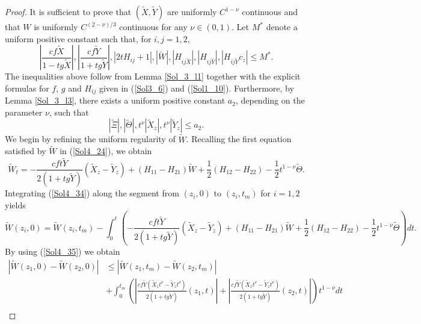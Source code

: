 \documentclass[10pt,a4paper]{amsart}
\begin{document}
 \begin{proof}
     It is sufficient to prove that $(\widetilde X, \widetilde Y)$ are uniformly $C^{1-\nu}$ continuous and that $W$ is uniformly $C^{(2-\nu)/3}$ continuous for any $\nu\in(0,1)$. Let $M^{\ast}$ denote a uniform positive constant such that, for $i,j=1,2$,
     \begin{equation}\label{Sol4_32}
         \left | \frac{cf\widetilde X}{1-tg\widetilde X}\right|, \left | \frac{cf\widetilde Y}{1+tg\widetilde Y}\right|, |2tH_{ij}+1|, |\widetilde W|, |H_{ij\widetilde X}|, |H_{ij\widetilde Y}|,|H_{ij\widetilde Y}c_z|\leq M^*.
     \end{equation}
     The inequalities above follow from Lemma \ref{Sol_3_l1} together with the explicit formulas for $f$, $g$ and $H_{ij}$ given in (\ref{Sol3_6}) and (\ref{Sol1_10}). Furthermore, by Lemma \ref{Sol_3_l3}, there exists a uniform positive constant $a_{2}$, depending on the parameter $\nu$, such that
     \begin{equation}\label{Sol4_33}
         |\widetilde\Xi|, |\widetilde\Theta|, t^\nu|\widetilde X_z|, t^\nu|\widetilde Y_z|\leq a_2.
     \end{equation}
     We begin by refining the uniform regularity of $\widetilde W$. Recalling the first equation satisfied by $\widetilde W$ in (\ref{Sol4_24}), we obtain
     \begin{equation}\label{Sol4_34}
         \widetilde W_t=-\frac{cft\widetilde Y}{2(1+tg\widetilde Y)}(\widetilde X_z-\widetilde Y_z) +(H_{11}-H_{21})\widetilde W+\frac{1}{2}(H_{12}-H_{22})-\frac{1}{2}t^{1-\nu}\widetilde \Theta.
     \end{equation}
     Integrating (\ref{Sol4_34}) along the segment from $(z_{i},0)$ to $(z_{i},t_{m})$ for $i=1,2$ yields
     \begin{equation}\label{Sol4_35}
          \widetilde W(z_i,0)=\widetilde W(z_i,t_m)-\int_0^t\left(-\frac{cft\widetilde Y}{2(1+tg\widetilde Y)}(\widetilde X_z-\widetilde Y_z) +(H_{11}-H_{21})\widetilde W+\frac{1}{2}(H_{12}-H_{22})-\frac{1}{2}t^{1-\nu}\widetilde \Theta \right)dt.
     \end{equation}
     By using (\ref{Sol4_35}) we obtain
     \begin{equation}\label{Sol4_36}
          \begin{split}
              |\widetilde W(z_1,0)-\widetilde W(z_2,0)|&\leq |\widetilde W(z_1,t_m)-\widetilde W(z_2,t_m)| \\&+\int_0^{t_m}\left(\left|\frac{cf\widetilde Y (\widetilde X_z t^\nu-\widetilde Y_z t^\nu)}{2(1+tg\widetilde Y)}(z_1,t) \right|+\left|\frac{cf\widetilde Y (\widetilde X_z t^\nu-\widetilde Y_z t^\nu)}{2(1+tg\widetilde Y)}(z_2,t) \right|\right)t^{1-\nu}dt\\

\end{split}
\end{equation}
\end{proof}
\end{document}
